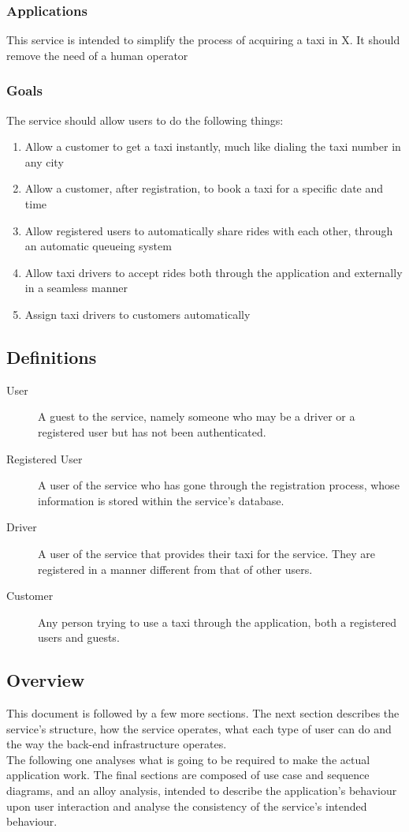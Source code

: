	\subsubsection{Applications}
		This service is intended to simplify the process of acquiring a taxi in X. It should remove the need of a human operator
	\subsubsection{Goals}
		The service should allow users to do the following things:
		\begin{enumerate}
		\item Allow a customer to get a taxi instantly, much like dialing the taxi number in any city
		\item Allow a customer, after registration, to book a taxi for a specific date and time
		\item Allow registered users to automatically share rides with each other, through an automatic queueing system
		\item Allow taxi drivers to accept rides both through the application and externally in a seamless manner
		\item Assign taxi drivers to customers automatically 
		\end{enumerate}
			
\subsection{Definitions}
	\begin{description}
		\item[User]
			A guest to the service, namely someone who may be a driver or a registered user but has not been authenticated.
		\item[Registered User]
			A user of the service who has gone through the registration process, whose information is stored within the service's database.
		\item[Driver]
			A user of the service that provides their taxi for the service. They are registered in a manner different from that of other users.
		\item[Customer]
			Any person trying to use a taxi through the application, both a registered users and guests.
	\end{description}
\subsection{Overview}
	This document is followed by a few more sections.
	The next section describes the service's structure, how the service operates, what each type of user can do and the way the
	back-end infrastructure operates. \\
	The following one analyses what is going to be required to make the actual application work.
	The final sections are composed of  use case and sequence diagrams, and an alloy analysis, intended to describe the application's behaviour upon user
	interaction and analyse the consistency of the service's intended behaviour.

